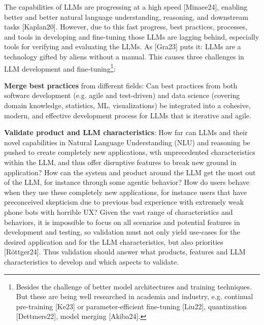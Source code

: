 \documentclass[twocolumn]{article}
\begin{document}
The capabilities of LLMs are progressing at a high speed [Minaee24],
enabling better and better natural language understanding, reasoning, and downstream tasks [Kaplan20].
However, due to this fast progress, best practices, processes, and tools in developing and fine-tuning those LLMs are lagging behind,
especially tools for verifying and evaluating the LLMs.
As [Gra23] puts it: LLMs are a technology gifted by aliens without a manual.
This causes three challenges in LLM development and fine-tuning\footnote{Besides the challenge of better model architectures and training techniques. But these are being well researched in academia and industry, e.g. continual pre-training [Ke23] or parameter-efficient fine-tuning [Liu22], quantization [Dettmers22], model merging [Akiba24].}:
\begin{compactenum}
\item {\bfseries Merge best practices} from different fields: Can best practices from both software development (e.g. agile and test-driven) and data science (covering domain knowledge, statistics, ML, visualizations) be integrated into a cohesive, modern, and effective development process for LLMs that is iterative and agile.
\item {\bfseries Validate product and LLM characteristics}: How far can LLMs and their novel capabilities in Natural Language Understanding (NLU) and reasoning be pushed to create
completely new applications, wth unprecedented characteristics within the LLM, and thus offer disruptive features to break new ground in application? How can the system and product around the LLM get the most out of the LLM, for instance through some agentic behavior? How do users behave when they use these completely new applications, for instance users that have preconceived skepticism due to previous bad experience with extremely weak phone bots with horrible UX? Given the vast range of characteristics and behaviors, it is impossible to focus on all scenarios and potential features in development and testing, so validation must not only yield use-cases for the desired application and for the LLM characteristics, but also priorities [Röttger24]. Thus validation should answer what products, features and LLM characteristics to develop and which aspects to validate.

\end{compactenum}
\end{document}
